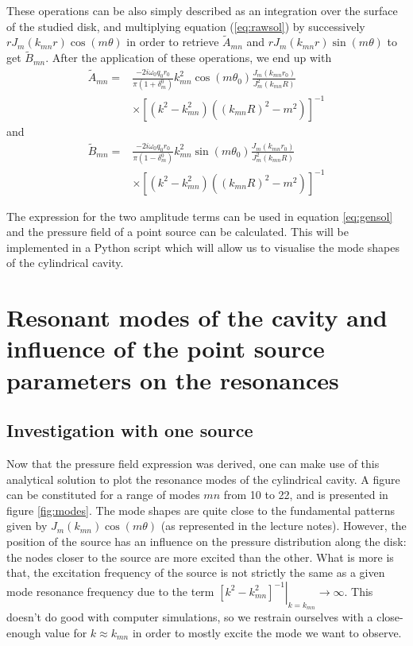 \documentclass[%
 reprint,
 amsmath,amssymb,
 aip,
]{revtex4-1}
\begin{document}
These operations can be also simply described as an integration over the surface of the studied disk, and multiplying equation (\ref{eq:rawsol}) by successively $r J_m(k_{mn}r) \cos(m\theta)$ in order to retrieve $\tilde{A}_{mn}$ and $r J_m(k_{mn}r) \sin(m\theta)$ to get $\tilde{B}_{mn}$. After the application of these operations, we end up with
\begin{equation}
    \begin{split}
        \tilde{A}_{mn} =& \frac{- 2 i \omega_0 q_0 r_0}{\pi (1 + \delta_m^0)} k_{mn}^2  \cos(m \theta_0) \frac{J_m(k_{mn}r_0)}{J^2_m(k_{mn}R)}\\ &\times\left[(k^2 - k^2_{mn}) ((k_{mn}R)^2 - m^2)\right]^{-1}
    \end{split}
\end{equation}
and 
\begin{equation}
    \begin{split}
        \tilde{B}_{mn} =& \frac{- 2 i \omega_0 q_0 r_0}{\pi (1 - \delta_m^0)} k_{mn}^2  \sin(m \theta_0) \frac{J_m(k_{mn}r_0)}{J^2_m(k_{mn}R)}\\ &\times\left[(k^2 - k^2_{mn}) ((k_{mn}R)^2 - m^2)\right]^{-1}
    \end{split}
\end{equation}

The expression for the two amplitude terms can be used in equation \ref{eq:gensol} and the pressure field of a point source can be calculated. This will be implemented in a Python script which will allow us to visualise the mode shapes of the cylindrical cavity.  

\section{Resonant modes of the cavity and influence of the point source parameters on the resonances}
\subsection{Investigation with one source}
Now that the pressure field expression was derived, one can make use of this analytical solution to plot the resonance modes of the cylindrical cavity. A figure can be constituted for a range of modes $mn$ from 10 to 22, and is presented in figure \ref{fig:modes}. The mode shapes are quite close to the fundamental patterns given by $J_m(k_{mn})\cos(m\theta)$ (as represented in the lecture notes). However, the position of the source has an influence on the pressure distribution along the disk: the nodes closer to the source are more excited than the other. What is more is that, the excitation frequency of the source is not strictly the same as a given mode resonance frequency due to the term $\left.\left[k^2 - k^2_{mn}\right]^{-1}\right|_{k = k_{mn}} \longrightarrow \infty$. This doesn't do good with computer simulations, so we restrain ourselves with a close-enough value for $k \approx k_{mn}$ in order to mostly excite the mode we want to observe.
\end{document}
